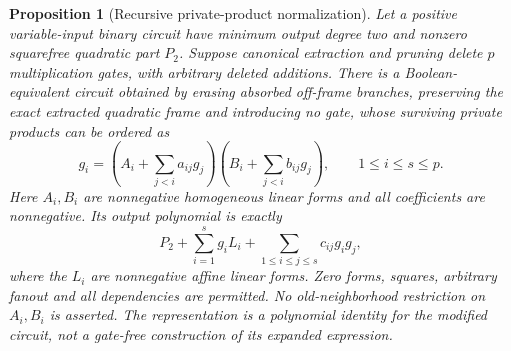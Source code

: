 \documentclass[11pt]{article}
\newtheorem{proposition}[theorem]{Proposition}
\theoremstyle{definition}
\theoremstyle{remark}
\begin{document}
\begin{proposition}[Recursive private-product normalization]\label{prop:recursivenormal}
Let a positive variable-input binary circuit have minimum output degree two and nonzero squarefree quadratic part $P_2$. Suppose canonical extraction and pruning delete $p$ multiplication gates, with arbitrary deleted additions. There is a Boolean-equivalent circuit obtained by erasing absorbed off-frame branches, preserving the exact extracted quadratic frame and introducing no gate, whose surviving private products can be ordered as
\[
 g_i=\left(A_i+\sum_{j<i}a_{ij}g_j\right)
     \left(B_i+\sum_{j<i}b_{ij}g_j\right),\qquad 1\le i\le s\le p.
\]
Here $A_i,B_i$ are nonnegative homogeneous linear forms and all coefficients are nonnegative. Its output polynomial is exactly
\[
 P_2+\sum_{i=1}^s g_iL_i+\sum_{1\le i\le j\le s}c_{ij}g_ig_j,
\]
where the $L_i$ are nonnegative affine linear forms. Zero forms, squares, arbitrary fanout and all dependencies are permitted. No old-neighborhood restriction on $A_i,B_i$ is asserted. The representation is a polynomial identity for the modified circuit, not a gate-free construction of its expanded expression.
\end{proposition}
\end{document}
